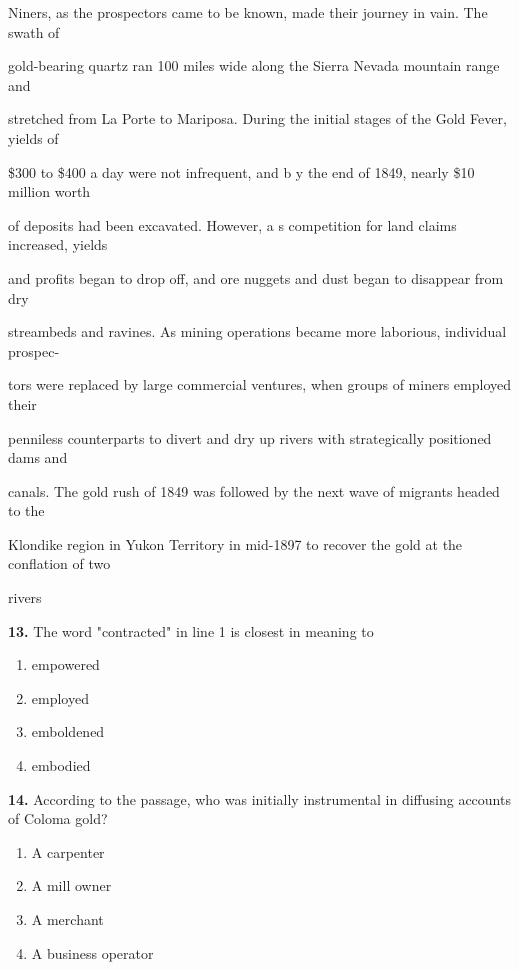\documentclass[12pt]{article}
\begin{document}
Niners, as the prospectors came to be known, made their journey in vain. The swath of\par
gold-bearing quartz ran 100 miles wide along the Sierra Nevada mountain range and\par
stretched from La Porte to Mariposa. During the initial stages of the Gold Fever, yields of\par
\$300 to \$400 a day were not infrequent, and b y the end of 1849, nearly \$10 million worth\par
of deposits had been excavated. However, a s competition for land claims increased, yields\par
and profits began to drop off, and ore nuggets and dust began to disappear from dry\par
streambeds and ravines. As mining operations became more laborious, individual prospec-\par
tors were replaced by large commercial ventures, when groups of miners employed their\par
penniless counterparts to divert and dry up rivers with strategically positioned dams and\par
canals. The gold rush of 1849 was followed by the next wave of migrants headed to the\par
Klondike region in Yukon Territory in mid-1897 to recover the gold at the conflation of two\par
rivers\par
\endgroup
\medskip
\noindent\textbf{13.} The word "contracted" in line 1 is closest in meaning to
\begin{enumerate}[label=(\Alph*),leftmargin=*,itemsep=0.2em]
\item empowered
\item employed
\item emboldened
\item embodied
\end{enumerate}
\par
\vspace{0.25\baselineskip}
\noindent\textbf{14.} According to the passage, who was initially instrumental in diffusing accounts of Coloma gold?
\begin{enumerate}[label=(\Alph*),leftmargin=*,itemsep=0.2em]
\item A carpenter
\item A mill owner
\item A merchant
\item A business operator
\end{enumerate}
\end{document}

